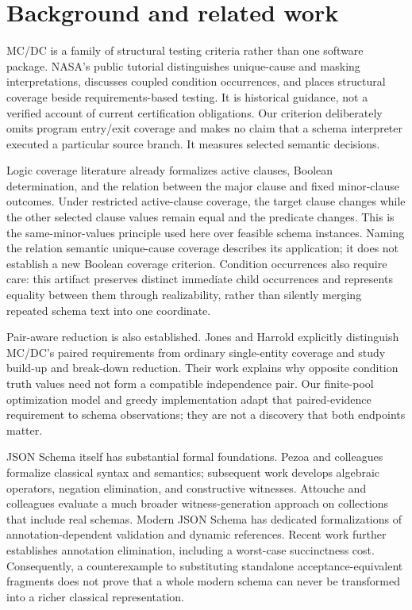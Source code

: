 \documentclass[sigconf,nonacm]{acmart}
\begin{document}
\section{Background and related work}
MC/DC is a family of structural testing criteria rather than one software package. NASA's public tutorial distinguishes unique-cause and masking interpretations, discusses coupled condition occurrences, and places structural coverage beside requirements-based testing. It is historical guidance, not a verified account of current certification obligations. Our criterion deliberately omits program entry/exit coverage and makes no claim that a schema interpreter executed a particular source branch. It measures selected semantic decisions. \cite{ref1}

Logic coverage literature already formalizes active clauses, Boolean determination, and the relation between the major clause and fixed minor-clause outcomes. Under restricted active-clause coverage, the target clause changes while the other selected clause values remain equal and the predicate changes. This is the same-minor-values principle used here over feasible schema instances. Naming the relation semantic unique-cause coverage describes its application; it does not establish a new Boolean coverage criterion. Condition occurrences also require care: this artifact preserves distinct immediate child occurrences and represents equality between them through realizability, rather than silently merging repeated schema text into one coordinate. \cite{ref3}

Pair-aware reduction is also established. Jones and Harrold explicitly distinguish MC/DC's paired requirements from ordinary single-entity coverage and study build-up and break-down reduction. Their work explains why opposite condition truth values need not form a compatible independence pair. Our finite-pool optimization model and greedy implementation adapt that paired-evidence requirement to schema observations; they are not a discovery that both endpoints matter. \cite{ref2}

JSON Schema itself has substantial formal foundations. Pezoa and colleagues formalize classical syntax and semantics; subsequent work develops algebraic operators, negation elimination, and constructive witnesses. Attouche and colleagues evaluate a much broader witness-generation approach on collections that include real schemas. Modern JSON Schema has dedicated formalizations of annotation-dependent validation and dynamic references. Recent work further establishes annotation elimination, including a worst-case succinctness cost. Consequently, a counterexample to substituting standalone acceptance-equivalent fragments does not prove that a whole modern schema can never be transformed into a richer classical representation. \cite{ref4,ref5,ref6,ref7,ref8}
\end{document}
